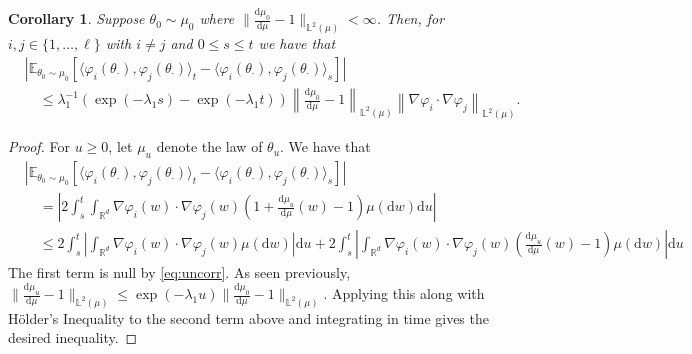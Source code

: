 \documentclass[11pt]{article}
\theoremstyle{plain}
\newtheorem{corollary}[theorem]{Corollary}
\theoremstyle{definition}
\theoremstyle{remark}
\numberwithin{equation}{section}
\newcommand{\R}{\mathbb{R}}
\renewcommand{\d}{\mathrm{d}}
\newcommand{\lb}{\left}
\newcommand{\rb}{\right}
\newcommand{\bL}{\mathbb{L}}
\newcommand{\E}{\mathbb{E}}
\begin{document}
\begin{corollary}\label{coro:uncorr}
Suppose $\theta_0\sim \mu_0$ where $\|\frac{\d\mu_0}{\d\mu}-1\|_{\bL^2(\mu)}<\infty$. Then, for $i,j\in\{1,\dots,\ell\}$ with $i\neq j$ and $0\le s\le t$ we have that
\begin{align*}
&\lb|\E_{\theta_0\sim\mu_0}\lb[\langle\varphi_i(\theta_\cdot),\varphi_j(\theta_\cdot)\rangle _t-\langle\varphi_i(\theta_\cdot),\varphi_j(\theta_\cdot)\rangle _s \rb]\rb|\\
&\quad\le \lambda_1^{-1}\lb(\exp(-\lambda_1 s)-\exp(-\lambda_1 t)\rb)\lb\|\frac{\d\mu_0}{\d\mu}-1\rb\|_{\bL^2(\mu)}\lb\|\nabla \varphi_i\cdot\nabla\varphi_j\rb\|_{\bL^2(\mu)}.
\end{align*}
\end{corollary}
\begin{proof}
For $u\ge 0 $, let $\mu_u$ denote the law of $\theta_u$. We have that
\begin{align*}
&\lb|\E_{\theta_0\sim\mu_0}\lb[\langle\varphi_i(\theta_\cdot),\varphi_j(\theta_\cdot)\rangle _t-\langle\varphi_i(\theta_\cdot),\varphi_j(\theta_\cdot)\rangle _s \rb]\rb|\\
&\quad = \lb|2\int_s^t\int_{\R^d}\nabla \varphi_i(w)\cdot\nabla\varphi_j(w)\lb(1+\frac{\d\mu_u}{\d\mu}(w)-1\rb)\mu(\d w)\d u\rb|\\
&\quad \le 2\int_s^t\lb|\int_{\R^d}\nabla \varphi_i(w)\cdot\nabla\varphi_j(w)\mu(\d w)\rb|\d u+2\int_s^t\lb|\int_{\R^d}\nabla \varphi_i(w)\cdot\nabla\varphi_j(w)\lb(\frac{\d\mu_u}{\d\mu}(w)-1\rb)\mu(\d w)\rb|\d u
\end{align*}
The first term is null by \eqref{eq:uncorr}.
As seen previously, $\|\frac{\d\mu_u}{\d\mu}-1\|_{\bL^2(\mu)}\le\exp\lb(-\lambda_1 u\rb)\|\frac{\d\mu_0}{\d\mu}-1\|_{\bL^2(\mu)}$. Applying this along with H\"{o}lder's Inequality to the second term above and integrating in time gives the desired inequality. \qedhere
\end{proof}
\end{document}

